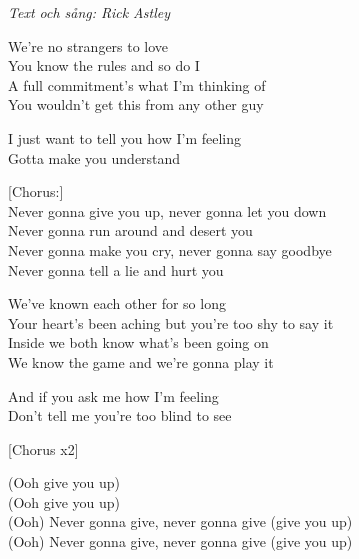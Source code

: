 {\footnotesize\textit{Text och sång: Rick Astley}}\par
\vspace{10pt}
We're no strangers to love\\
You know the rules and so do I\\
A full commitment's what I'm thinking of\\
You wouldn't get this from any other guy\par
\vspace{10pt}
I just want to tell you how I'm feeling\\
Gotta make you understand\par
\vspace{10pt}
[Chorus:]\\
Never gonna give you up, never gonna let you down\\
Never gonna run around and desert you\\
Never gonna make you cry, never gonna say goodbye\\
Never gonna tell a lie and hurt you\par
\vspace{10pt}
We've known each other for so long\\
Your heart's been aching but you're too shy to say it\\
Inside we both know what's been going on\\
We know the game and we're gonna play it\par
\vspace{10pt}
And if you ask me how I'm feeling \\
Don't tell me you're too blind to see\par
\vspace{10pt}
[Chorus x2]\par%
\vspace{10pt}
(Ooh give you up)\\
(Ooh give you up)\\
(Ooh) Never gonna give, never gonna give (give you up)\\
(Ooh) Never gonna give, never gonna give (give you up)\par
